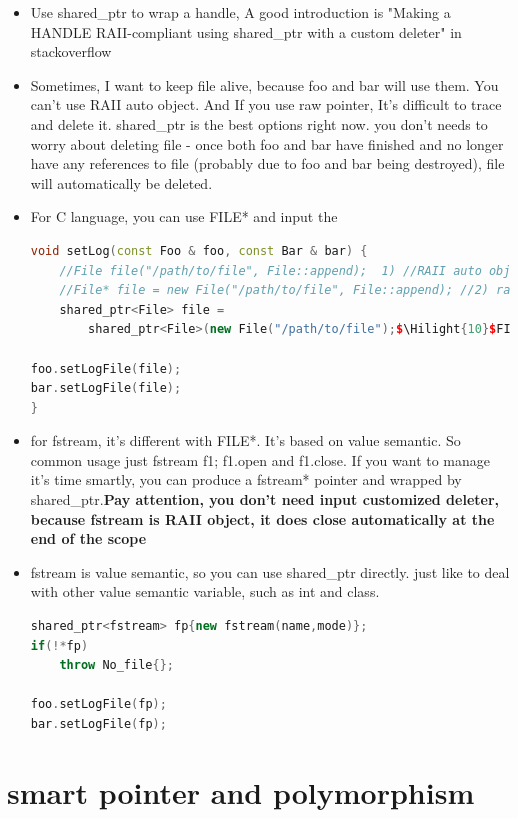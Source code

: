 \documentclass[a4paper,12pt,twoside]{book}
\newcommand{\Hilight}[1]{\makebox[0pt][l]{\color{yellow}\rule[-3pt]{#1em}{11pt}}}
\begin{document}
\begin{itemize}
	
	\item Use shared\_ptr to wrap a handle, A good introduction is "Making a HANDLE RAII-compliant using shared\_ptr with a custom deleter" in stackoverflow
	
	
	\item Sometimes, I want to keep file alive, because foo and bar will use them. You can't use RAII auto object. And If you use raw pointer, It's difficult to trace and delete it. shared\_ptr is the best options right now.  you don't needs to worry about deleting file - once both foo and bar have finished and no longer have any references to file (probably due to foo and bar being destroyed), file will automatically be deleted.
	
	\item For C language, you can use FILE* and input the 
\begin{lstlisting}[frame=single, language=c++]
void setLog(const Foo & foo, const Bar & bar) {
	//File file("/path/to/file", File::append);  1) //RAII auto obj
	//File* file = new File("/path/to/file", File::append); //2) raw new
	shared_ptr<File> file =
		shared_ptr<File>(new File("/path/to/file");$\Hilight{10}$FILEDeleter()) //3) best
	
foo.setLogFile(file);
bar.setLogFile(file);
}
	\end{lstlisting}
	
	\item for fstream, it's different with FILE*. It's based on value semantic. So common usage just fstream f1; f1.open and f1.close. If you want to manage it's time smartly, you can produce a fstream* pointer and wrapped by shared\_ptr.\textbf{Pay attention, you don't need input customized deleter, because fstream is RAII object, it does close automatically at the end of the scope}
	
	\item fstream is value semantic, so you can use shared\_ptr directly. just like to deal with other value semantic variable, such as int and class.
\begin{lstlisting}[frame=single, language=c++]
shared_ptr<fstream> fp{new fstream(name,mode)};
if(!*fp)
	throw No_file{};
		
foo.setLogFile(fp);
bar.setLogFile(fp);
\end{lstlisting}

\end{itemize}

\section{smart pointer and polymorphism}
\end{document}

